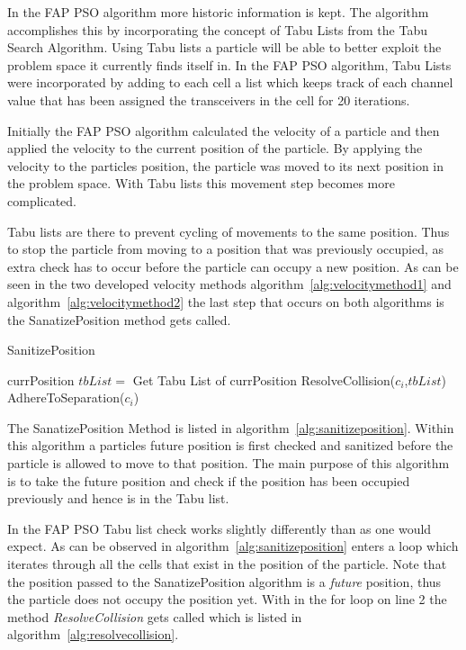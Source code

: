 In the FAP PSO algorithm more historic information is kept. The algorithm accomplishes this by incorporating the concept of Tabu Lists from the Tabu Search Algorithm. Using Tabu lists a particle will be able to better exploit the problem space it currently finds itself in. In the FAP PSO algorithm, Tabu Lists were incorporated by adding to each cell a list which keeps track of each channel value that has been assigned the transceivers in the cell for 20 iterations.

Initially the FAP PSO algorithm calculated the velocity of a particle and then applied the velocity to the current position of the particle. By applying the velocity to the particles position, the particle was moved to its next position in the problem space. With Tabu lists this movement step becomes more complicated.

Tabu lists are there to prevent cycling of movements to the same position. Thus to stop the particle from moving to a position that was previously occupied, as extra check has to occur before the particle can occupy a new position. As can be seen in the two developed velocity methods algorithm~\ref{alg:velocitymethod1} and algorithm~\ref{alg:velocitymethod2} the last step that occurs on both algorithms is the SanatizePosition method gets called.

\begin{algorithm}
\caption{SanitizePosition}
\label{alg:sanitizeposition}
\begin{algorithmic}[1]
	\REQUIRE currPosition
		\STATE $tbList = $ Get Tabu List of currPosition
		\STATE ResolveCollision($c_i$,$tbList$)
		\STATE AdhereToSeparation($c_i$)
	\ENDFOR
\end{algorithmic}
\end{algorithm}

The SanatizePosition Method is listed in algorithm~\ref{alg:sanitizeposition}. Within this algorithm a particles future position is first checked and sanitized before the particle is allowed to move to that position. The main purpose of this algorithm is to take the future position and check if the position has been occupied previously and hence is in the Tabu list.

In the FAP PSO Tabu list check works slightly differently than as one would expect. As can be observed in algorithm~\ref{alg:sanitizeposition} enters a loop which iterates through all the cells that exist in the position of the particle. Note that the position passed to the SanatizePosition algorithm is a \emph{future} position, thus the particle does not occupy the position yet. With in the for loop on line 2 the method \emph{ResolveCollision} gets called which is listed in algorithm~\ref{alg:resolvecollision}.

